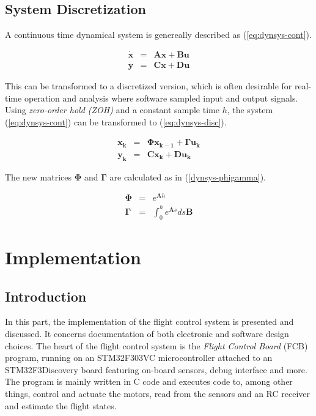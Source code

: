 \documentclass[a4paper]{report}
\begin{document}
\begin{appendices}

\chapter{System Discretization} \label{ch:sysdisc}

A continuous time dynamical system is genereally described as (\ref{eq:dynsys-cont}).

\begin{eqnarray}
	\mathbf{\dot{x}} & = & \mathbf{ A x } + \mathbf{ B u } \nonumber \\
	\mathbf{y} & = & \mathbf{Cx} + \mathbf{Du}
	\label{eq:dynsys-cont}
\end{eqnarray}

This can be transformed to a discretized version, which is often desirable for real-time operation and analysis where software sampled input and output signals. Using \emph{zero-order hold (ZOH)} and a constant sample time $h$, the system (\ref{eq:dynsys-cont}) can be transformed to (\ref{eq:dynsys-disc}).

\begin{eqnarray}
\mathbf{x_{k}} & = & \mathbf{\Phi x_{k-1}} + \mathbf{\Gamma u_{k}} \nonumber \\
\mathbf{y_k} & = & \mathbf{C x_k} + \mathbf{D u_k}
\label{eq:dynsys-disc}
\end{eqnarray}

The new matrices $\mathbf{\Phi}$ and $\mathbf{\Gamma}$ are calculated as in (\ref{dynsys-phigamma}).

\begin{eqnarray}
\mathbf{\Phi} & = & e^{\mathbf{A}h} \nonumber \\
\mathbf{\Gamma} & = & \int_{0}^{h} e^{\mathbf{A}s} ds \mathbf{B}
\label{eq:dynsys-disc}
\end{eqnarray}

\end{appendices}

%
%
\part{Implementation}

\chapter{Introduction}
In this part, the implementation of the flight control system is presented and discussed. It concerns documentation of both electronic and software design choices. The heart of the flight control system is the \emph{Flight Control Board} (FCB) program, running on an STM32F303VC microcontroller attached to an STM32F3Discovery board featuring on-board sensors, debug interface and more. The program is mainly written in C code and executes code to, among other things, control and actuate the motors, read from the sensors and an RC receiver and estimate the flight states.
\end{document}
